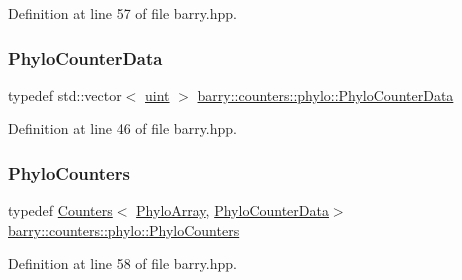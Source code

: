 Definition at line 57 of file barry.\+hpp.

\mbox{\label{namespacebarry_1_1counters_1_1phylo_a6ecc0d8ab76f8dc2db152221a8e9e95a}} 
\subsubsection{\texorpdfstring{Phylo\+Counter\+Data}{PhyloCounterData}}
{\footnotesize\ttfamily typedef std\+::vector$<$ \hyperlink{namespacebarry_a11dfc53ddb4672278319aa04f1e09a6c}{uint} $>$ \hyperlink{namespacebarry_1_1counters_1_1phylo_a6ecc0d8ab76f8dc2db152221a8e9e95a}{barry\+::counters\+::phylo\+::\+Phylo\+Counter\+Data}}



Definition at line 46 of file barry.\+hpp.

\mbox{\label{namespacebarry_1_1counters_1_1phylo_a4e401ffe66d04091343dcffaf915f8c3}} 
\subsubsection{\texorpdfstring{Phylo\+Counters}{PhyloCounters}}
{\footnotesize\ttfamily typedef \hyperlink{classbarry_1_1_counters}{Counters}$<$ \hyperlink{namespacebarry_1_1counters_1_1phylo_abd293bf65e494e903639fb5fb2c91604}{Phylo\+Array}, \hyperlink{namespacebarry_1_1counters_1_1phylo_a6ecc0d8ab76f8dc2db152221a8e9e95a}{Phylo\+Counter\+Data}$>$ \hyperlink{namespacebarry_1_1counters_1_1phylo_a4e401ffe66d04091343dcffaf915f8c3}{barry\+::counters\+::phylo\+::\+Phylo\+Counters}}



Definition at line 58 of file barry.\+hpp.

\mbox{\label{namespacebarry_1_1counters_1_1phylo_ad32b4186e3bab93119df225fddc3c609}} 
